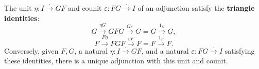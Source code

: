 The unit $\eta: I \xrightarrow{\cdot} GF$ and counit $\varepsilon: FG \xrightarrow{\cdot} I$ of an adjunction satisfy the \textbf{triangle identities}:
\[
G \xrightarrow{\eta G} GFG \xrightarrow{G\varepsilon} G = G \xrightarrow{1_G} G,
\]
\[
F \xrightarrow{F\eta} FGF \xrightarrow{\varepsilon F} F = F \xrightarrow{1_F} F.
\]
Conversely, given $F, G$, a natural $\eta: I \xrightarrow{\cdot} GF$, and a natural $\varepsilon: FG \xrightarrow{\cdot} I$ satisfying these identities, there is a unique adjunction with this unit and counit.